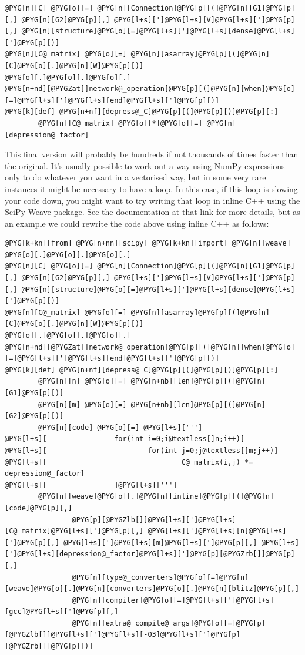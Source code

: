 \documentclass[letterpaper,10pt,english]{manual}
\begin{document}
\begin{Verbatim}[commandchars=@\[\]]
@PYG[n][C] @PYG[o][=] @PYG[n][Connection]@PYG[p][(]@PYG[n][G1]@PYG[p][,] @PYG[n][G2]@PYG[p][,] @PYG[l+s][']@PYG[l+s][V]@PYG[l+s][']@PYG[p][,] @PYG[n][structure]@PYG[o][=]@PYG[l+s][']@PYG[l+s][dense]@PYG[l+s][']@PYG[p][)]
@PYG[n][C@_matrix] @PYG[o][=] @PYG[n][asarray]@PYG[p][(]@PYG[n][C]@PYG[o][.]@PYG[n][W]@PYG[p][)]
@PYG[o][.]@PYG[o][.]@PYG[o][.]
@PYG[n+nd][@PYGZat[]network@_operation]@PYG[p][(]@PYG[n][when]@PYG[o][=]@PYG[l+s][']@PYG[l+s][end]@PYG[l+s][']@PYG[p][)]
@PYG[k][def] @PYG[n+nf][depress@_C]@PYG[p][(]@PYG[p][)]@PYG[p][:]
        @PYG[n][C@_matrix] @PYG[o][*]@PYG[o][=] @PYG[n][depression@_factor]
\end{Verbatim}

This final version will probably be hundreds if not thousands of times faster
than the original. It's usually possible to work out a way using NumPy
expressions only to do whatever you want in a vectorised way, but in some
very rare instances it might be necessary to have a loop. In this case, if
this loop is slowing your code down, you might want to try writing that
loop in inline C++ using the \href{http://www.scipy.org/Weave}{SciPy Weave}
package. See the documentation at that link for more details, but as an
example we could rewrite the code above using inline C++ as follows:

\begin{Verbatim}[commandchars=@\[\]]
@PYG[k+kn][from] @PYG[n+nn][scipy] @PYG[k+kn][import] @PYG[n][weave]
@PYG[o][.]@PYG[o][.]@PYG[o][.]
@PYG[n][C] @PYG[o][=] @PYG[n][Connection]@PYG[p][(]@PYG[n][G1]@PYG[p][,] @PYG[n][G2]@PYG[p][,] @PYG[l+s][']@PYG[l+s][V]@PYG[l+s][']@PYG[p][,] @PYG[n][structure]@PYG[o][=]@PYG[l+s][']@PYG[l+s][dense]@PYG[l+s][']@PYG[p][)]
@PYG[n][C@_matrix] @PYG[o][=] @PYG[n][asarray]@PYG[p][(]@PYG[n][C]@PYG[o][.]@PYG[n][W]@PYG[p][)]
@PYG[o][.]@PYG[o][.]@PYG[o][.]
@PYG[n+nd][@PYGZat[]network@_operation]@PYG[p][(]@PYG[n][when]@PYG[o][=]@PYG[l+s][']@PYG[l+s][end]@PYG[l+s][']@PYG[p][)]
@PYG[k][def] @PYG[n+nf][depress@_C]@PYG[p][(]@PYG[p][)]@PYG[p][:]
        @PYG[n][n] @PYG[o][=] @PYG[n+nb][len]@PYG[p][(]@PYG[n][G1]@PYG[p][)]
        @PYG[n][m] @PYG[o][=] @PYG[n+nb][len]@PYG[p][(]@PYG[n][G2]@PYG[p][)]
        @PYG[n][code] @PYG[o][=] @PYG[l+s][''']
@PYG[l+s][                for(int i=0;i@textless[]n;i++)]
@PYG[l+s][                        for(int j=0;j@textless[]m;j++)]
@PYG[l+s][                                C@_matrix(i,j) *= depression@_factor]
@PYG[l+s][                ]@PYG[l+s][''']
        @PYG[n][weave]@PYG[o][.]@PYG[n][inline]@PYG[p][(]@PYG[n][code]@PYG[p][,]
                @PYG[p][@PYGZlb[]]@PYG[l+s][']@PYG[l+s][C@_matrix]@PYG[l+s][']@PYG[p][,] @PYG[l+s][']@PYG[l+s][n]@PYG[l+s][']@PYG[p][,] @PYG[l+s][']@PYG[l+s][m]@PYG[l+s][']@PYG[p][,] @PYG[l+s][']@PYG[l+s][depression@_factor]@PYG[l+s][']@PYG[p][@PYGZrb[]]@PYG[p][,]
                @PYG[n][type@_converters]@PYG[o][=]@PYG[n][weave]@PYG[o][.]@PYG[n][converters]@PYG[o][.]@PYG[n][blitz]@PYG[p][,]
                @PYG[n][compiler]@PYG[o][=]@PYG[l+s][']@PYG[l+s][gcc]@PYG[l+s][']@PYG[p][,]
                @PYG[n][extra@_compile@_args]@PYG[o][=]@PYG[p][@PYGZlb[]]@PYG[l+s][']@PYG[l+s][-O3]@PYG[l+s][']@PYG[p][@PYGZrb[]]@PYG[p][)]
\end{Verbatim}
\end{document}
